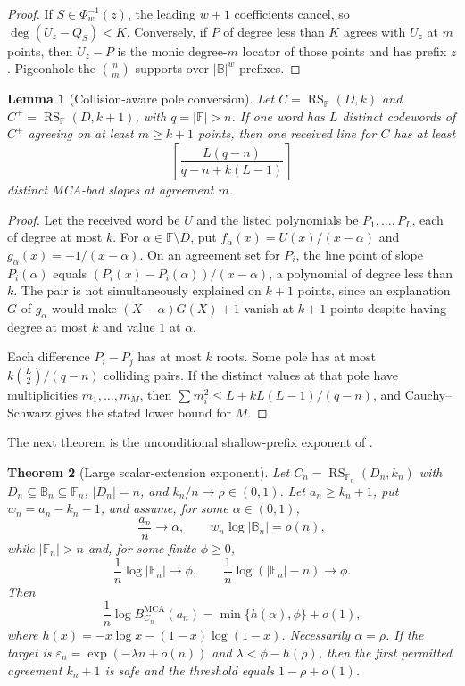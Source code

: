 \documentclass[11pt,a4paper]{amsart}
\numberwithin{equation}{section}
\newtheorem{theorem}{Theorem}[section]
\newtheorem{lemma}[theorem]{Lemma}
\theoremstyle{remark}
\DeclareMathOperator{\RS}{RS}
\DeclareMathOperator{\MCA}{MCA}
\newcommand{\F}{\mathbb F}
\newcommand{\B}{\mathbb B}
\newcommand{\eps}{\varepsilon}
\newcommand{\abs}[1]{\lvert#1\rvert}
\newcommand{\ceil}[1]{\left\lceil#1\right\rceil}
\begin{document}
\begin{proof}
If $S\in\Phi_w^{-1}(z)$, the leading $w+1$ coefficients cancel, so $\deg(U_z-Q_S)<K$.  Conversely, if $P$ of degree less than $K$ agrees with $U_z$ at $m$ points, then $U_z-P$ is the monic degree-$m$ locator of those points and has prefix $z$.  Pigeonhole the $\binom nm$ supports over $\abs\B^w$ prefixes.
\end{proof}

\begin{lemma}[Collision-aware pole conversion]\label{lem:pole}
Let $C=\RS_{\F}(D,k)$ and $C^+=\RS_{\F}(D,k+1)$, with $q=\abs\F>n$.  If one word has $L$ distinct codewords of $C^+$ agreeing on at least $m\ge k+1$ points, then one received line for $C$ has at least
\[
 \ceil{\frac{L(q-n)}{q-n+k(L-1)}}
\]
distinct MCA-bad slopes at agreement $m$.
\end{lemma}

\begin{proof}
Let the received word be $U$ and the listed polynomials be $P_1,\ldots,P_L$, each of degree at most $k$.  For $\alpha\in\F\setminus D$, put $f_\alpha(x)=U(x)/(x-\alpha)$ and $g_\alpha(x)=-1/(x-\alpha)$.  On an agreement set for $P_i$, the line point of slope $P_i(\alpha)$ equals $(P_i(x)-P_i(\alpha))/(x-\alpha)$, a polynomial of degree less than $k$.  The pair is not simultaneously explained on $k+1$ points, since an explanation $G$ of $g_\alpha$ would make $(X-\alpha)G(X)+1$ vanish at $k+1$ points despite having degree at most $k$ and value $1$ at $\alpha$.

Each difference $P_i-P_j$ has at most $k$ roots.  Some pole has at most $k\binom L2/(q-n)$ colliding pairs.  If the distinct values at that pole have multiplicities $m_1,\ldots,m_M$, then $\sum m_i^2\le L+kL(L-1)/(q-n)$, and Cauchy--Schwarz gives the stated lower bound for $M$.
\end{proof}

The next theorem is the unconditional shallow-prefix exponent of \cite{ChoGF26}.

\begin{theorem}[Large scalar-extension exponent]\label{thm:large-extension}
Let $C_n=\RS_{\F_n}(D_n,k_n)$ with $D_n\subseteq\B_n\subseteq\F_n$, $\abs{D_n}=n$, and $k_n/n\to\rho\in(0,1)$.  Let $a_n\ge k_n+1$, put $w_n=a_n-k_n-1$, and assume, for some $\alpha\in(0,1)$,
\[
 \frac{a_n}{n}\to\alpha,\qquad w_n\log\abs{\B_n}=o(n),
\]
while $\abs{\F_n}>n$ and, for some finite $\phi\ge0$,
\[
 \frac1n\log\abs{\F_n}\to\phi,
 \qquad \frac1n\log(\abs{\F_n}-n)\to\phi.
\]
Then
\[
 \frac1n\log B_{C_n}^{\MCA}(a_n)=\min\{h(\alpha),\phi\}+o(1),
\]
where $h(x)=-x\log x-(1-x)\log(1-x)$.  Necessarily $\alpha=\rho$.  If the target is $\eps_n=\exp(-\lambda n+o(n))$ and $\lambda<\phi-h(\rho)$, then the first permitted agreement $k_n+1$ is safe and the threshold equals $1-\rho+o(1)$.
\end{theorem}
\end{document}

